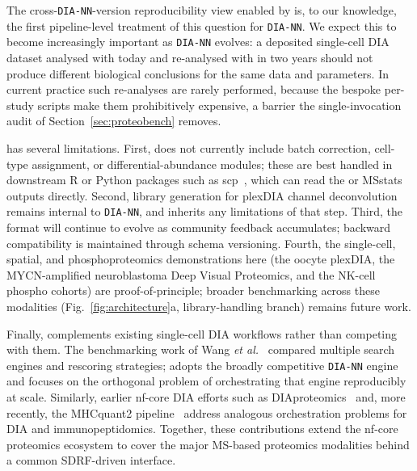 The cross-\texttt{DIA-NN}-version reproducibility view enabled by \quantmsdiann{} is, to our knowledge, the first pipeline-level treatment of this question for \texttt{DIA-NN}.
We expect this to become increasingly important as \texttt{DIA-NN} evolves: a deposited single-cell DIA dataset analysed with  today and re-analysed with  in two years should not produce different biological conclusions for the same data and parameters. In current practice such re-analyses are rarely performed, because the bespoke per-study scripts make them prohibitively expensive, a barrier the single-invocation audit of Section~\ref{sec:proteobench} removes.

\quantmsdiann{} has several limitations.
First, \quantmsdiann{} does not currently include batch correction, cell-type assignment, or differential-abundance modules; these are best handled in downstream R or Python packages such as scp~\cite{vanderaa2023}, which can read the \qpx{} or MSstats outputs directly.
Second, library generation for plexDIA channel deconvolution remains internal to \texttt{DIA-NN}, and \quantmsdiann{} inherits any limitations of that step.
Third, the \qpx{} format will continue to evolve as community feedback accumulates; backward compatibility is maintained through schema versioning.
Fourth, the single-cell, spatial, and phosphoproteomics demonstrations here (the oocyte plexDIA, the MYCN-amplified neuroblastoma Deep Visual Proteomics, and the NK-cell phospho cohorts) are proof-of-principle; broader benchmarking across these modalities (Fig.~\ref{fig:architecture}a, library-handling branch) remains future work.

Finally, \quantmsdiann{} complements existing single-cell DIA workflows rather than competing with them.
The benchmarking work of Wang \textit{et al.}~\cite{wang2025} compared multiple search engines and rescoring strategies; \quantmsdiann{} adopts the broadly competitive \texttt{DIA-NN} engine and focuses on the orthogonal problem of orchestrating that engine reproducibly at scale.
Similarly, earlier nf-core DIA efforts such as DIAproteomics~\cite{bichmann2021diaproteomics} and, more recently, the MHCquant2 pipeline~\cite{scheid2025mhcquant2} address analogous orchestration problems for DIA and immunopeptidomics.
Together, these contributions extend the nf-core proteomics ecosystem to cover the major MS-based proteomics modalities behind a common SDRF-driven interface.
